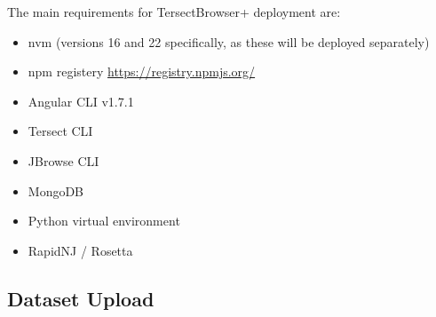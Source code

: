 \documentclass[12pt]{article}
\begin{document}
The main requirements for TersectBrowser+ deployment are:
\begin{itemize}
    \item nvm (versions 16 and 22 specifically, as these will be deployed separately)
    \item npm registery \url{https://registry.npmjs.org/}
    \item Angular CLI v1.7.1
    \item Tersect CLI
    \item JBrowse CLI
    \item MongoDB
    \item Python virtual environment
    \item RapidNJ / Rosetta
\end{itemize}

\subsection{Dataset Upload}
\end{document}
